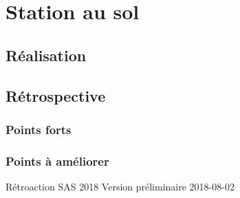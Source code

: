 \chapter{Station au sol}
\label{chap:sas}

\section{Réalisation}



\section{Rétrospective}

\subsection{Points forts}



\subsection{Points à améliorer}


Rétroaction SAS 2018
Version préliminaire 2018-08-02

